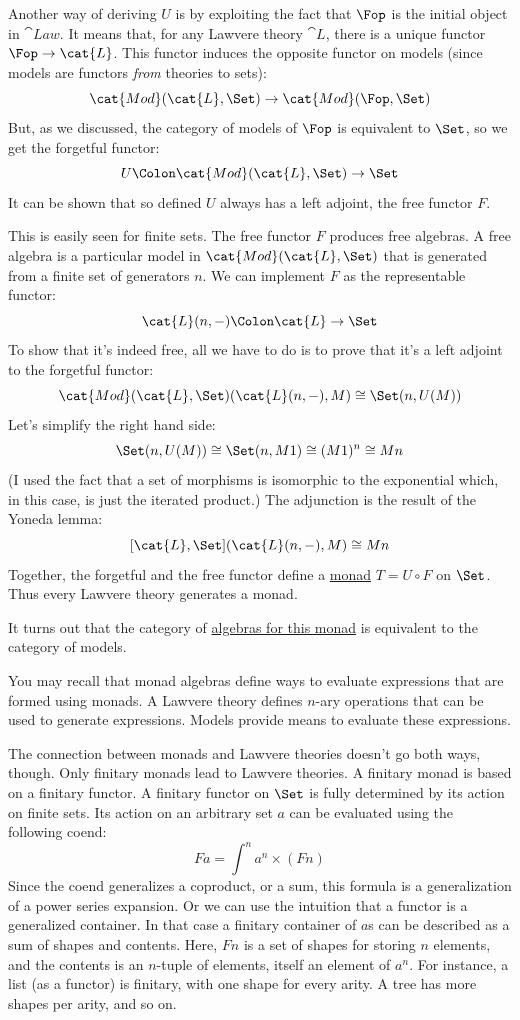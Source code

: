 Another way of deriving $U$ is by exploiting the fact that
$\Fop$ is the initial object in $\cat{Law}$. It
means that, for any Lawvere theory $\cat{L}$, there is a unique
functor $\Fop \to \cat{L}$. This functor induces the
opposite functor on models (since models are functors \emph{from}
theories to sets):
\[\cat{Mod}(\cat{L}, \Set) \to \cat{Mod}(\Fop, \Set)\]
But, as we discussed, the category of models of
$\Fop$ is equivalent to $\Set$, so we get
the forgetful functor:
\[U \Colon \cat{Mod}(\cat{L}, \Set) \to \Set\]
It can be shown that so defined $U$ always has a left adjoint,
the free functor $F$.

This is easily seen for finite sets. The free functor $F$
produces free algebras. A free algebra is a particular model in
$\cat{Mod}(\cat{L}, \Set)$ that is generated from a finite set of generators
$n$. We can implement $F$ as the representable functor:
\[\cat{L}(n, -) \Colon \cat{L} \to \Set\]
To show that it's indeed free, all we have to do is to prove that it's a
left adjoint to the forgetful functor:
\[\cat{Mod}(\cat{L}, \Set)(\cat{L}(n, -), M) \cong \Set(n, U(M))\]
Let's simplify the right hand side:
\[\Set(n, U(M)) \cong \Set(n, M 1) \cong (M 1)^n \cong M n\]
(I used the fact that a set of morphisms is isomorphic to the
exponential which, in this case, is just the iterated product.) The
adjunction is the result of the Yoneda lemma:
\[[\cat{L}, \Set](\cat{L}(n, -), M) \cong M n\]
Together, the forgetful and the free functor define a
\hyperref[monads-categorically]{monad}
$T = U \circ F$ on $\Set$. Thus every Lawvere theory generates
a monad.

It turns out that the category of
\hyperref[algebras-for-monads]{algebras
  for this monad} is equivalent to the category of models.

You may recall that monad algebras define ways to evaluate expressions
that are formed using monads. A Lawvere theory defines $n$-ary operations
that can be used to generate expressions. Models provide means to
evaluate these expressions.

The connection between monads and Lawvere theories doesn't go both ways,
though. Only finitary monads lead to Lawvere theories. A finitary monad
is based on a finitary functor. A finitary functor on $\Set$ is
fully determined by its action on finite sets. Its action on an
arbitrary set $a$ can be evaluated using the following coend:
\[F a = \int^n a^n \times (F n)\]
Since the coend generalizes a coproduct, or a sum, this formula is a
generalization of a power series expansion. Or we can use the intuition
that a functor is a generalized container. In that case a finitary
container of $a$s can be described as a sum of shapes and
contents. Here, $F n$ is a set of shapes for storing $n$ elements,
and the contents is an $n$-tuple of elements, itself an element of
$a^n$. For instance, a list (as a functor) is finitary, with one
shape for every arity. A tree has more shapes per arity, and so on.

